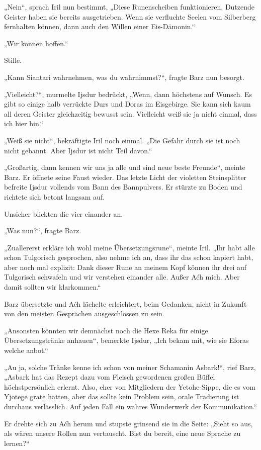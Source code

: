 „Nein“, sprach Iril nun bestimmt, „Diese Runenscheiben funktionieren. Dutzende Geister haben sie bereits ausgetrieben. Wenn sie verfluchte Seelen vom Silberberg fernhalten können, dann auch den Willen einer Eis-Dämonin.“

„Wir können hoffen.“

Stille.

„Kann Siantari wahrnehmen, was du wahrnimmst?“, fragte Barz nun besorgt.

„Vielleicht?“, murmelte Ijsdur bedrückt, „Wenn, dann höchstens auf Wunsch. Es gibt so einige halb verrückte Durs und Doras im Eisgebirge. Sie kann sich kaum all deren Geister gleichzeitig bewusst sein. Vielleicht weiß sie ja nicht einmal, dass ich hier bin.“

„Weiß sie nicht“, bekräftigte Iril noch einmal. „Die Gefahr durch sie ist noch nicht gebannt. Aber Ijsdur ist nicht Teil davon.“

„Großartig, dann kennen wir uns ja alle und sind neue beste Freunde“, meinte Barz. Er öffnete seine Faust wieder. Das letzte Licht der violetten Steinsplitter befreite Ijsdur vollends vom Bann des Bannpulvers. Er stürzte zu Boden und richtete sich betont langsam auf.

Unsicher blickten die vier einander an.

„Was nun?“, fragte Barz.

„Zuallererst erkläre ich wohl meine Übersetzungsrune“, meinte Iril. „Ihr habt alle schon Tulgorisch gesprochen, also nehme ich an, dass ihr das schon kapiert habt, aber noch mal explizit: Dank dieser Rune an meinem Kopf können ihr drei auf Tulgorisch schwafeln und wir verstehen einander alle. Außer Aćh mich. Aber damit sollten wir klarkommen.“

Barz übersetzte und Aćh lächelte erleichtert, beim Gedanken, nicht in Zukunft von den meisten Gesprächen ausgeschlossen zu sein.

„Ansonsten könnten wir demnächst noch die Hexe Reka für einige Übersetzungstränke anhauen“, bemerkte Ijsdur, „Ich bekam mit, wie sie Eforas welche anbot.“

„Au ja, solche Tränke kenne ich schon von meiner Schamanin Asbark!“, rief Barz, „Asbark hat das Rezept dazu vom Fleisch gewordenen großen Büffel höchstpersönlich erlernt. Also, eher von Mitgliedern der Yetohe-Sippe, die es vom Yjotege grate hatten, aber das sollte kein Problem sein, orale Tradierung ist durchaus verlässlich. Auf jeden Fall ein wahres Wunderwerk der Kommunikation.“

Er drehte sich zu Aćh herum und stupste grinsend sie in die Seite: „Sieht so aus, als wären unsere Rollen nun vertauscht. Bist du bereit, eine neue Sprache zu lernen?“

